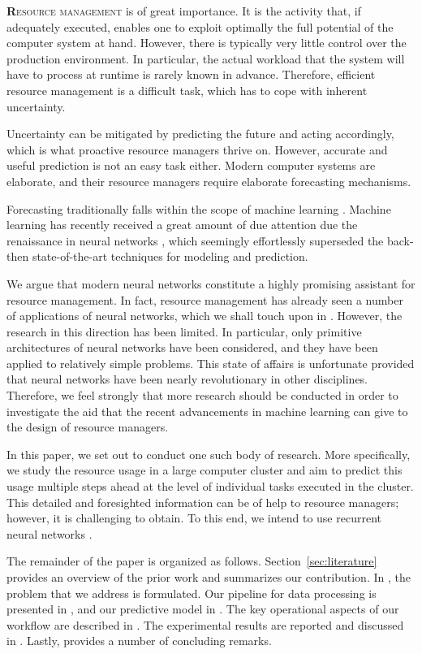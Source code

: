 \lettrine[findent=0.2em, nindent=0em]{\textbf{R}}{esource management} is of
great importance. It is the activity that, if adequately executed, enables one
to exploit optimally the full potential of the computer system at hand. However,
there is typically very little control over the production environment. In
particular, the actual workload that the system will have to process at runtime
is rarely known in advance. Therefore, efficient resource management is a
difficult task, which has to cope with inherent uncertainty.

Uncertainty can be mitigated by predicting the future and acting accordingly,
which is what proactive resource managers thrive on. However, accurate and
useful prediction is not an easy task either. Modern computer systems are
elaborate, and their resource managers require elaborate forecasting mechanisms.

Forecasting traditionally falls within the scope of machine learning
\cite{hastie2009}. Machine learning has recently received a great amount of due
attention due the renaissance in neural networks \cite{goodfellow2016}, which
seemingly effortlessly superseded the back-then state-of-the-art techniques for
modeling and prediction.

We argue that modern neural networks constitute a highly promising assistant for
resource management. In fact, resource management has already seen a number of
applications of neural networks, which we shall touch upon in .
However, the research in this direction has been limited. In particular, only
primitive architectures of neural networks have been considered, and they have
been applied to relatively simple problems. This state of affairs is unfortunate
provided that neural networks have been nearly revolutionary in other
disciplines. Therefore, we feel strongly that more research should be conducted
in order to investigate the aid that the recent advancements in machine learning
can give to the design of resource managers.

In this paper, we set out to conduct one such body of research. More
specifically, we study the resource usage in a large computer cluster and aim to
predict this usage multiple steps ahead at the level of individual tasks
executed in the cluster. This detailed and foresighted information can be of
help to resource managers; however, it is challenging to obtain. To this end, we
intend to use recurrent neural networks \cite{goodfellow2016}.

The remainder of the paper is organized as follows. Section~\ref{sec:literature}
provides an overview of the prior work and summarizes our contribution. In
, the problem that we address is formulated. Our pipeline for data
processing is presented in , and our predictive model in
. The key operational aspects of our workflow are described in
. The experimental results are reported and discussed in
. Lastly,  provides a number of concluding
remarks.
